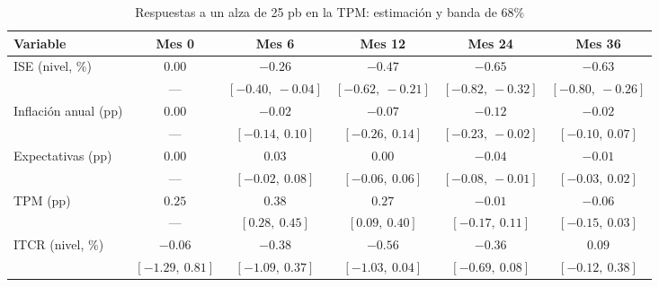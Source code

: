 \begin{table}[H]
\centering
\caption{Respuestas a un alza de 25 pb en la TPM: estimación y banda de 68\%}
\label{tab:D_resultados}
\footnotesize
\begin{tabular}{@{}lccccc@{}}
\toprule
Variable & Mes 0 & Mes 6 & Mes 12 & Mes 24 & Mes 36 \\
\midrule
ISE (nivel, \%) & $0.00$ & $-0.26$ & $-0.47$ & $-0.65$ & $-0.63$ \\
 & --- & $[-0.40,\ -0.04]$ & $[-0.62,\ -0.21]$ & $[-0.82,\ -0.32]$ & $[-0.80,\ -0.26]$ \\
\addlinespace
Inflación anual (pp) & $0.00$ & $-0.02$ & $-0.07$ & $-0.12$ & $-0.02$ \\
 & --- & $[-0.14,\ 0.10]$ & $[-0.26,\ 0.14]$ & $[-0.23,\ -0.02]$ & $[-0.10,\ 0.07]$ \\
\addlinespace
Expectativas (pp) & $0.00$ & $0.03$ & $0.00$ & $-0.04$ & $-0.01$ \\
 & --- & $[-0.02,\ 0.08]$ & $[-0.06,\ 0.06]$ & $[-0.08,\ -0.01]$ & $[-0.03,\ 0.02]$ \\
\addlinespace
TPM (pp) & $0.25$ & $0.38$ & $0.27$ & $-0.01$ & $-0.06$ \\
 & --- & $[0.28,\ 0.45]$ & $[0.09,\ 0.40]$ & $[-0.17,\ 0.11]$ & $[-0.15,\ 0.03]$ \\
\addlinespace
ITCR (nivel, \%) & $-0.06$ & $-0.38$ & $-0.56$ & $-0.36$ & $0.09$ \\
 & $[-1.29,\ 0.81]$ & $[-1.09,\ 0.37]$ & $[-1.03,\ 0.04]$ & $[-0.69,\ 0.08]$ & $[-0.12,\ 0.38]$ \\
\bottomrule
\end{tabular}
\end{table}
